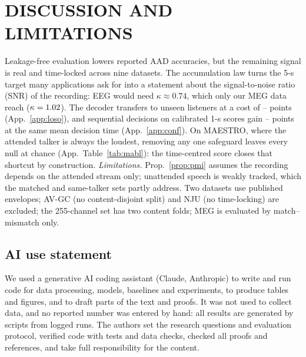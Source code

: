 \documentclass[twoside]{article}
\begin{document}
\section{DISCUSSION AND LIMITATIONS}
Leakage-free evaluation lowers reported AAD accuracies, but the remaining signal is real and
time-locked across nine datasets. The accumulation law turns the 5-s target many applications ask for into a statement about the
signal-to-noise ratio (SNR) of the recording: EEG would need $\kappa\approx0.74$, which only our MEG data reach ($\kappa=1.02$).  The decoder transfers to unseen listeners at a cost of
\losoDropMin--\losoDropMax{} points (App.~\ref{app:loso}), and sequential decisions on
calibrated 1-s scores gain \confGainTwoMin--\confGainTwoMax{} points at the same mean
decision time (App.~\ref{app:conf}). On MAESTRO, where the attended talker is always the
loudest, removing any one safeguard leaves every null at chance (App.~Table~\ref{tab:mabl}): the
time-centred score closes that shortcut by construction.
\emph{Limitations.}
Prop.~\ref{prop:pmi} assumes the recording depends on the attended stream only;
unattended speech is weakly tracked, which the matched and same-talker sets partly
address. Two datasets use published envelopes; AV-GC (no content-disjoint split) and NJU (no
time-locking) are excluded; the 255-channel set has two content folds; MEG is evaluated by
match--mismatch only.

\subsection*{AI use statement}
We used a generative AI coding assistant (Claude, Anthropic) to write and run code for data
processing, models, baselines and experiments, to produce tables and figures, and to draft
parts of the text and proofs. It was not used to collect data, and no reported number was
entered by hand: all results are generated by scripts from logged runs. The authors set the
research questions and evaluation protocol, verified code with tests and data checks,
checked all proofs and references, and take full responsibility for the content.



\end{document}
